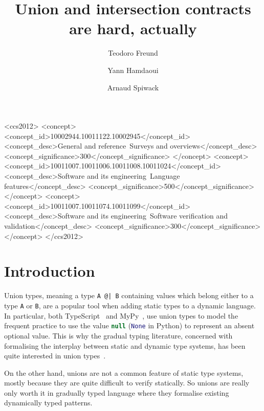 \documentclass[sigplan,screen,10pt]{acmart}
\title{Union and intersection contracts are hard, actually}
\author{Teodoro Freund}
\affiliation{
  \institution{Universidad de Buenos Aires}
  \city{Buenos Aires}
  \country{Argentina}
}
\author{Yann Hamdaoui}
\affiliation{
  \institution{Tweag}
  \city{Paris}
  \country{France}
}
\author{Arnaud Spiwack}
\affiliation{
  \institution{Tweag}
  \city{Paris}
  \country{France}
}
\newcommand{\nickel}[1]{\lstinline[language=nickel]{#1}}
\newcommand{\typescript}[1]{\lstinline[language=JavaScript]{#1}}
\newcommand{\python}[1]{\lstinline[language=Python]{#1}}
\begin{document}
\begin{CCSXML}
<ccs2012>
   <concept>
       <concept_id>10002944.10011122.10002945</concept_id>
       <concept_desc>General and reference~Surveys and overviews</concept_desc>
       <concept_significance>300</concept_significance>
       </concept>
   <concept>
       <concept_id>10011007.10011006.10011008.10011024</concept_id>
       <concept_desc>Software and its engineering~Language features</concept_desc>
       <concept_significance>500</concept_significance>
       </concept>
   <concept>
       <concept_id>10011007.10011074.10011099</concept_id>
       <concept_desc>Software and its engineering~Software verification and validation</concept_desc>
       <concept_significance>300</concept_significance>
       </concept>
 </ccs2012>
\end{CCSXML}





\maketitle

\section{Introduction}
\label{sec:intro}

Union types, meaning a type \nickel{A @| B} containing values which
belong either to a type \nickel{A} or \nickel{B}, are a popular tool
when adding static types to a dynamic language. In particular, both
TypeScript~\cite{TypeScriptUnions} and MyPy~\cite{MyPyOptional}, use
union types to model the frequent practice to use the value
\typescript{null} (\python{None} in Python) to represent an absent
optional value. This is why the gradual typing literature, concerned
with formalising the interplay between static and dynamic type
systems, has been quite interested in union
types~\cite{RootCauseOfBlame,gradualCastagna,ORTIN2011278,ToroTanterGradualUnion,KeilThiemannUnionIntersection}.

On the other hand, unions are not a common feature of static type
systems, mostly because they are quite difficult to verify
statically. So unions are really only worth it in gradually typed
language where they formalise existing dynamically typed patterns.
\end{document}
